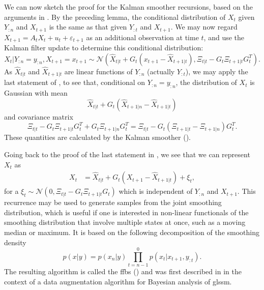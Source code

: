 We can now sketch the proof for the Kalman smoother recursions, based on the arguments in \citep[Chapter 7.3]{Chopin2020Introduction}. By the preceding lemma, the conditional distribution of $X_{t}$ given $Y_{:n}$ and $X_{t + 1}$ is the same as that given $Y_{:t}$ and $X_{t + 1}$. 
We may now regard $X_{t + 1} = A_{t}X_{t} + u_{t} + \varepsilon_{t + 1}$ as an additional observation at time $t$, and use the Kalman filter update to determine this conditional distribution:
$$
X_{t} | Y_{:n} = y_{:n}, X_{t + 1} = x_{t+1}\sim \mathcal N \left(\hat X_{t|t} + G_{t}(x_{t + 1} - \hat X_{t + 1 | t}), \Xi_{t |t} - G_{t} \Xi_{t + 1 | t} G_{t}^{T} \right).
$$
As $\hat X_{t|t}$ and $\hat X_{t+1|t}$ are linear functions of $Y_{:n}$ (actually $Y_{:t}$), we may apply the last statement of , to see that, conditional on $Y_{:n} = y_{:n}$, the distribution of $X_{t}$ is Gaussian with mean
$$
\hat X_{t|t} + G_{t} \left( \hat X_{t + 1 | n} - \hat X_{t + 1 | t} \right)
$$
and covariance matrix 
$$
\Xi_{t | t} - G_{t} \Xi_{t + 1|t} G_{t}^{T} + G_{t} \Xi_{t + 1 | n} G_{t}^{T} = \Xi_{t|t} - G_{t} \left( \Xi_{t + 1 | t} - \Xi_{t + 1 | n} \right)G_{t} ^{T}.
$$
These quantities are calculated by the Kalman smoother ().

Going back to the proof of the last statement in , we see that we can represent $X_{t}$ as
\begin{align}
    \label{eq:kalman-smoother-backwards-recursion}
    X_{t} &= \hat X_{t|t} + G_{t}(X_{t + 1} - \hat X_{t + 1 | t}) + \xi_{t},
\end{align}
for a $\xi_{t} \sim \mathcal N \left( 0, \Xi_{t | t} - G_{t} \Xi_{t + 1|t}G_{t} \right)$ which is independent of $Y_{:n}$ and $X_{t + 1}$.
This recurrence may be used to generate samples from the joint smoothing distribution, which is useful if one is interested in non-linear functionals of the smoothing distribution that involve multiple states at once, such as a moving median or maximum. It is based on the following decomposition of the smoothing density
$$
p(x|y) = p(x_{n}|y) \prod_{t = n - 1}^0 p(x_{t}|x_{t+1}, y_{:t}).
$$
The resulting algorithm is called the \gls{ffbs} () and was first described in \citep{Fruhwirth-Schnatter1994Data} in the context of a data augmentation algorithm for Bayesian analysis of \acrshort{glssm}. %


